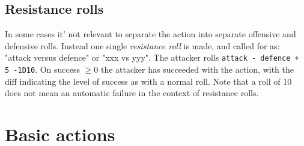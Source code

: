 \subsection*{Resistance rolls}
In some cases it' not relevant to separate the action into separate offensive and defensive rolls. Instead one single \emph{resistance roll} is made, and called for as: "attack versus defence" or "xxx vs yyy".
The attacker rolls \verb|attack - defence + 5 -1D10|. On success $\ge$0 the attacker has succeeded with the action, with the diff indicating the level of success as with a normal roll. Note that a roll of 10 does not mean an automatic failure in the context of resistance rolls.
%















\section*{Basic actions}


